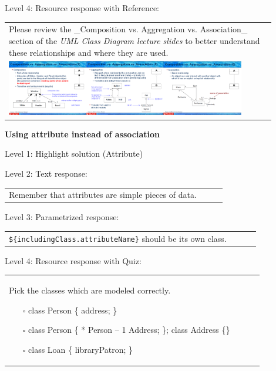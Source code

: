 \noindent Level 4: Resource response with Reference: \medskip

\begin{tabular}{|p{0.9\linewidth}}
Please review the _Composition vs. Aggregation vs. Association_ section of 
the \textit{UML Class Diagram lecture slides} to 
better understand these relationships and where they are used.

\\
\includegraphics[width=0.9\textwidth]{images/composition_aggregation_association.png}
\end{tabular} \medskip


\noindent \textbf{Using attribute instead of association} \medskip

\noindent Level 1: Highlight solution (Attribute) \medskip

\noindent Level 2: Text response: \medskip

\begin{tabular}{|p{0.9\linewidth}}
Remember that attributes are simple pieces of data.
\end{tabular} \medskip

\noindent Level 3: Parametrized response: \medskip

\begin{tabular}{|p{0.9\linewidth}}
\verb|${includingClass.attributeName}| should be its own class.
\end{tabular} \medskip

\noindent Level 4: Resource response with Quiz: \medskip

\begin{tabular}{|p{0.9\linewidth}}
Pick the classes which are modeled correctly.

\begin{itemize}
    \item[$\square$] class Person \{ address; \}
    \item[$\square$] class Person \{ * Person -- 1 Address; \}; class Address \{\}
    \item[$\square$] class Loan \{ libraryPatron; \}
\end{itemize}

\end{tabular} \medskip

